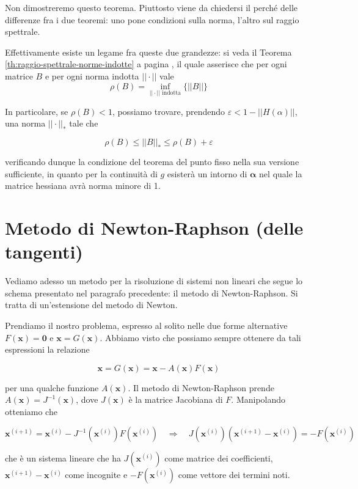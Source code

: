 Non dimostreremo questo teorema. Piuttosto viene da chiedersi il
perch\'e delle differenze fra i due teoremi: uno pone condizioni sulla
norma, l'altro sul raggio spettrale.

Effettivamente esiste un legame fra queste due grandezze: si veda il Teorema \ref{th:raggio-spettrale-norme-indotte} a pagina \pageref{th:raggio-spettrale-norme-indotte}, il quale asserisce che per ogni matrice $B$ e per ogni norma indotta $|| \cdot ||$ vale
$$ \rho(B) = \inf_{|| \cdot || \text{ indotta}}\{ ||B||\}$$

In particolare, se $ \rho(B) < 1 $, possiamo trovare, prendendo $
\varepsilon < 1 - || H(\alpha) || $, una norma $ ||\cdot||_* $ tale che

$$ \rho(B) \leq || B||_* \leq \rho(B) + \varepsilon$$

verificando dunque la condizione del teorema del punto fisso nella sua
versione sufficiente, in quanto per la continuit\`a di $g$ esister\`a un
intorno di $ \mathbf{\alpha} $ nel quale la matrice hessiana avr\`a norma
minore di 1.


\section{Metodo di Newton-Raphson (delle tangenti)}
\label{section:metodo-newton-raphson}
Vediamo adesso un metodo per la risoluzione di sistemi non
lineari che segue lo schema presentato nel paragrafo precedente: il metodo di Newton-Raphson. Si tratta di un'estensione del
metodo di Newton.

Prendiamo il nostro problema, espresso al solito nelle due forme
alternative $ F(\mathbf{x}) = \mathbf{0} $ e 
$ \mathbf{x} = G(\mathbf{x}) $. Abbiamo visto che possiamo
sempre ottenere da tali espressioni la relazione

\[ \mathbf{x} = G(\mathbf{x}) = \mathbf{x} -
A(\mathbf{x})F(\mathbf{x}) \]

per una qualche funzione $A(\mathbf{x})$. Il metodo di Newton-Raphson prende $A(\mathbf{x}) = J^{-1}(\mathbf{x}) $, dove 
$J(\mathbf{x})$ \`e la matrice Jacobiana di $F$. Manipolando
otteniamo che

\[ \mathbf{x}^{(i+1)} = \mathbf{x}^{(i)} - J^{-1}(\mathbf{x}^{(i)})F(\mathbf{x}^{(i)}) \quad \Rightarrow \quad J(\mathbf{x}^{(i)})(\mathbf{x}^{(i+1)} - \mathbf{x}^{(i)}) = - F(\mathbf{x}^{(i)}) \]

che \`e un sistema lineare che ha $ J(\mathbf{x}^{(i)}) $ come matrice dei
coefficienti, $ \mathbf{x}^{(i+1)} - \mathbf{x}^{(i)} $ come incognite e $ - F(\mathbf{x}^{(i)})$ come vettore dei termini noti.

